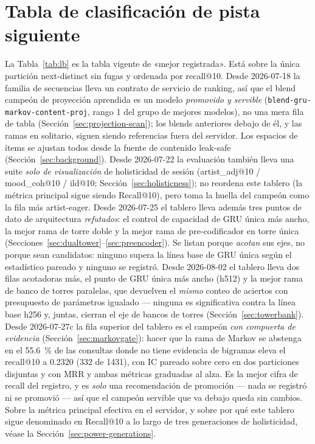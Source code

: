 \documentclass[11pt]{article}
\begin{document}
\section{Tabla de clasificación de pista siguiente}
\label{sec:leaderboard}
La Tabla~\ref{tab:lb} es la tabla vigente de «mejor registrada». Está sobre la
única partición next-distinct sin fugas y ordenada por recall@10. Desde
2026-07-18 la familia de secuencias lleva un contrato de servicio de ranking, así
que el blend campeón de proyección aprendida es un modelo \emph{promovido y
servible} (\texttt{blend-gru-markov-content-proj}, rango 1 del grupo de mejores
modelos), no una mera fila de tabla (Sección~\ref{sec:projection-scan}); los blends
anteriores debajo de él, y las ramas en solitario, siguen siendo referencias fuera
del servidor. Los espacios de ítems se ajustan todos desde la fuente de contenido
leak-safe (Sección~\ref{sec:background}). Desde 2026-07-22 la evaluación también
lleva una suite \emph{solo de visualización} de holisticidad de sesión (artist\_adj@10 /
mood\_coh@10 / ild@10; Sección~\ref{sec:holisticness}); no reordena este tablero (la
métrica principal sigue siendo Recall@10), pero toma la huella del campeón como la fila
más artist-eager. Desde 2026-07-25 el tablero lleva además tres puntos de dato de
arquitectura \emph{refutados}: el control de capacidad de GRU única más ancho, la
mejor rama de torre doble y la mejor rama de pre-codificador en torre única
(Secciones~\ref{sec:dualtower}--\ref{sec:preencoder}). Se listan porque
\emph{acotan} sus ejes, no porque sean candidatos: ninguno supera la línea base de
GRU única según el estadístico pareado y ninguno se registró. Desde 2026-08-02 el
tablero lleva dos filas acotadoras más, el punto de GRU única más ancho (h512) y
la mejor rama de banco de torres paralelas, que devuelven el \emph{mismo} conteo
de aciertos con presupuesto de parámetros igualado --- ninguna es significativa
contra la línea base h256 y, juntas, cierran el eje de bancos de torres
(Sección~\ref{sec:towerbank}). Desde 2026-07-27c la fila superior del tablero es
el campeón \emph{con compuerta de evidencia} (Sección~\ref{sec:markovgate}): hacer
que la rama de Markov se abstenga en el \SI{55.6}{\percent} de las consultas donde
no tiene evidencia de bigramas eleva el recall@10 a \num{0.2320} (\num{332} de
\num{1431}), con IC pareado sobre cero en dos particiones disjuntas y con MRR y
ambas métricas graduadas al alza. Es la mejor cifra de recall del registro, y es
\emph{solo} una recomendación de promoción --- nada se registró ni se promovió ---
así que el campeón servible que va debajo queda sin cambios.
Sobre la métrica principal efectiva en el servidor, y sobre por qué este tablero sigue denominado
en Recall@10 a lo largo de tres generaciones de holisticidad, véase la
Sección~\ref{sec:power-generations}.
\end{document}

